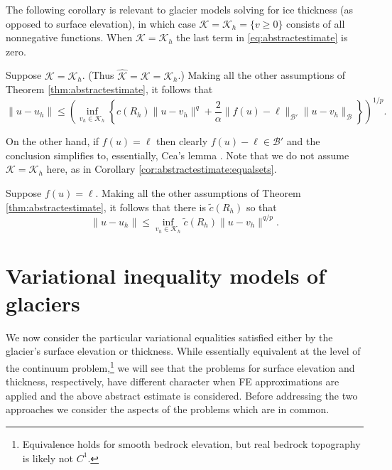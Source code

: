 \documentclass[hidelinks,onefignum,onetabnum,final]{siamart220329}  %
\newcommand{\cB}{\mathcal{B}}
\newcommand{\cK}{\mathcal{K}}
\newcommand{\hcK}{\widehat{\cK}}
\begin{document}
The following corollary is relevant to glacier models solving for ice thickness (as opposed to surface elevation), in which case $\cK = \cK_h = \{v\ge 0\}$ consists of all nonnegative functions.  When $\cK = \cK_h$ the last term in \eqref{eq:abstractestimate} is zero.

\begin{corollary}  \label{cor:abstractestimate:equalsets}
Suppose $\cK=\cK_h$.  (Thus $\hcK=\cK=\cK_h$.)  Making all the other assumptions of Theorem \ref{thm:abstractestimate}, it follows that
\begin{equation}
\|u-u_h\| \le \left(\inf_{v_h\in\cK_h} \left\{c(R_h) \|u - v_h\|^q + \frac{2}{\alpha} \|f(u)-\ell\|_{\cB'} \|u-v_h\|_{\cB}\right\}\right)^{1/p}. \label{eq:abstractestimate:equalsets}
\end{equation}
\end{corollary}

On the other hand, if $f(u)=\ell$ then clearly $f(u)-\ell \in \cB'$ and the conclusion simplifies to, essentially, Cea's lemma \cite{Ciarlet2002}.  Note that we do not assume $\cK=\cK_h$ here, as in Corollary \ref{cor:abstractestimate:equalsets}.

\begin{corollary}  \label{cor:abstractestimate:interior}
Suppose $f(u)=\ell$.  Making all the other assumptions of Theorem \ref{thm:abstractestimate}, it follows that there is $\tilde c(R_h)$ so that
\begin{equation}
\|u-u_h\| \le \inf_{v_h\in\cK_h} \tilde c(R_h) \|u - v_h\|^{q/p}. \label{eq:abstractestimate:interior}
\end{equation}
\end{corollary}


\section{Variational inequality models of glaciers} \label{sec:models}

We now consider the particular variational equalities satisfied either by the glacier's surface elevation or thickness.  While essentially equivalent at the level of the continuum problem,\footnote{Equivalence holds for smooth bedrock elevation, but real bedrock topography is likely not $C^1$.} we will see that the problems for surface elevation and thickness, respectively, have different character when FE approximations are applied and the above abstract estimate is considered.  Before addressing the two approaches we consider the aspects of the problems which are in common.
\end{document}
